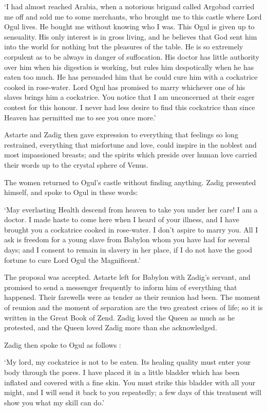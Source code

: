 \documentclass{article}
\begin{document}
\begin{center}
`I had almost reached Arabia, when a notorious brigand called Argobad carried me 
off and sold me to some merchants, who brought me to this castle where Lord Ogul 
lives. He bought me without knowing who I was. This Ogul is given up to sensuality. 
His only interest is in gross living, and he believes that God sent him into the 
world for nothing but the pleasures of the table. He is so extremely corpulent 
as to be always in danger of suffocation. His doctor has little authority over 
him when his digestion is working, but rules him despotically when he has eaten 
too much. He has persuaded him that he could cure him with a cockatrice cooked 
in rose-water. Lord Ogul has promised to marry whichever one of his slaves brings 
him a cockatrice. You notice that I am unconcerned at their eager contest for this 
honour. I never had less desire to find this cockatrice than since Heaven has permitted 
me to see you once more.' 

Astarte and Zadig then gave expression to everything that feelings so long restrained, 
everything that misfortune and love, could inspire in the noblest and most impassioned 
breasts; and the spirits which preside over human love carried their words up to 
the crystal sphere of Venus. 

The women returned to Ogul's castle without finding anything. Zadig presented himself, 
and spoke to Ogul in these words: 

`May everlasting Health descend from heaven to take you under her care! I am a 
doctor. I made haste to come here when I heard of your illness, and I have brought 
you a cockatrice cooked in rose-water. I don't aspire to marry you. All I ask is 
freedom for a young slave from Babylon whom you have had for several days; and 
I consent to remain in slavery in her place, if I do not have the good fortune 
to cure Lord Ogul the Magnificent.' 

The proposal was accepted. Astarte left for Babylon with Zadig's servant, and promised 
to send a messenger frequently to inform him of everything that happened. Their 
farewells were as tender as their reunion had been. The moment of reunion and the 
moment of separation are the two greatest crises of life; so it is written in the 
Great Book of Zend. Zadig loved the Queen as much as he protested, and the Queen 
loved Zadig more than she acknowledged. 

Zadig then spoke to Ogul as follows : 

`My lord, my cockatrice is not to be eaten. Its healing quality must enter your 
body through the pores. I have placed it in a little bladder which has been inflated 
and covered with a fine skin. You must strike this bladder with all your might, 
and I will send it back to you repeatedly; a few days of this treatment will show 
you what my skill can do.' 


\end{center}
\end{document}
